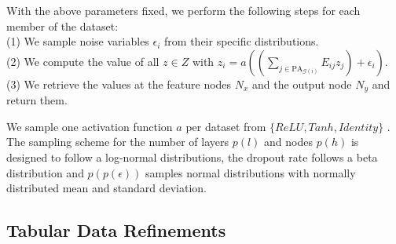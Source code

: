 \documentclass{article}
\begin{document}
With the above parameters fixed, we perform the following steps for each member of the dataset:\\
\hphantom{~~~~}(1) We sample noise variables $\epsilon_i$ from their specific distributions.\\
\hphantom{~~~~}(2) We compute the value of all $z \in Z$ with $z_i = a((\sum_{j \in \text{PA}_{\mathcal{G}(i)}} E_{ij} z_j) + \epsilon_i)$.\\
\hphantom{~~~~}(3) We retrieve the values at the feature nodes $N_x$ and the output node $N_y$ and return them.

We sample one activation function $a$ per dataset from $\{ReLU, Tanh, Identity\}$ \citep{nair2010rectified}. The sampling scheme for the number of layers $p(l)$ and nodes $p(h)$ is designed to follow a log-normal distributions, the dropout rate follows a beta distribution and $p(p(\epsilon))$ samples normal distributions with normally distributed mean and standard deviation.

\subsection{Tabular Data Refinements}
\label{sec:tabular data refinement}
\end{document}
